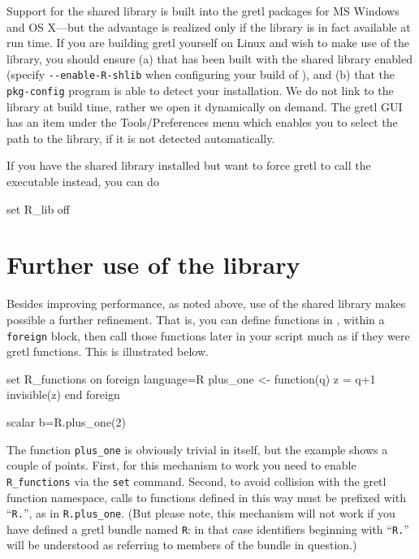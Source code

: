 Support for the  shared library is built into the gretl
packages for MS Windows and OS X---but the advantage is realized
only if the library is in fact available at run time.  If you are
building gretl yourself on Linux and wish to make use of the
 library, you should ensure (a) that  has been built
with the shared library enabled (specify \verb|--enable-R-shlib| when
configuring your build of ), and (b) that the \verb|pkg-config|
program is able to detect your  installation.  We do not link
to the  library at build time, rather we open it dynamically on
demand. The gretl GUI has an item under the
\textsf{Tools/Preferences} menu which enables you to select the
path to the library, if it is not detected automatically.  

If you have the  shared library installed but want to force
gretl to call the  executable instead, you can do
\begin{code}
set R_lib off
\end{code}

\section{Further use of the  library}
\label{sec:R-functions}

Besides improving performance, as noted above, use of the 
shared library makes possible a further refinement.  That is, you can
define functions in , within a \texttt{foreign} block, then
call those functions later in your script much as if they were
gretl functions.  This is illustrated below.  
%
\begin{code}
set R_functions on
foreign language=R
  plus_one <- function(q) {
     z = q+1
     invisible(z)
  }
end foreign

scalar b=R.plus_one(2)
\end{code}
%
The  function \verb|plus_one| is obviously trivial in itself,
but the example shows a couple of points.  First, for this mechanism
to work you need to enable \verb|R_functions| via the \texttt{set}
command.  Second, to avoid collision with the gretl function
namespace, calls to functions defined in this way must be prefixed
with ``\texttt{R.}'', as in \verb|R.plus_one|. (But please note, this
mechanism will not work if you have defined a gretl bundle named
\texttt{R}: in that case identifiers beginning with ``\texttt{R.{}}''
will be understood as referring to members of the bundle in question.)

